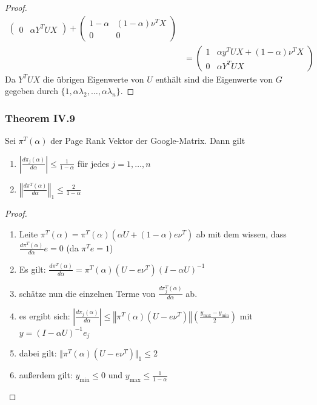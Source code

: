 \documentclass[]{article}
\begin{document}
\begin{proof}
\begin{align*}
\begin{pmatrix}
	0 & \alpha Y^T U X
	\end{pmatrix} 
	+
	\begin{pmatrix}
	1-\alpha & (1- \alpha) \nu^T X \\
	0 & 0
	\end{pmatrix}\\
	&=
	\begin{pmatrix}
	1 & \alpha y^T U X + (1- \alpha)\nu^T X \\
	0 & \alpha Y^T U X
	\end{pmatrix}
	\end{align*}
	Da $Y^T U X$ die übrigen Eigenwerte von $U$ enthält sind die Eigenwerte von $G$ gegeben durch $\{1, \alpha \lambda_2, \dotsc, \alpha \lambda_n \}$.
\end{proof}

\subsubsection*{Theorem IV.9}
Sei $\pi^T(\alpha)$ der Page Rank Vektor der Google-Matrix. Dann gilt
\begin{enumerate}
	\item $\left\vert \frac{d \pi_j(\alpha)}{d \alpha} \right\vert \leq \frac{1}{1- \alpha}$ für jedes $j = 1, \dotsc, n$
	\item $\left\Vert \frac{d \pi^T(\alpha)}{d \alpha} \right\Vert_1 \leq \frac{2}{1-\alpha}$
\end{enumerate}
\begin{proof}
	\begin{enumerate}
		\item Leite $\pi^T(\alpha) = \pi^T(\alpha) \left(\alpha U + (1- \alpha) e \nu^T \right)$ ab mit dem wissen, dass  $\frac{d \pi^T(\alpha)}{d \alpha} e = 0$ (da $\pi^T e = 1$)
		\item Es gilt: $\frac{d \pi^T(\alpha)}{d \alpha} = \pi^T(\alpha) (U - e \nu^T) (I - \alpha U)^{-1}$
		\item schätze nun die einzelnen Terme von $\frac{d \pi_j^T(\alpha)}{d \alpha}$ ab. 
		\item es ergibt sich: $\left\vert \frac{d \pi_j(\alpha)}{d \alpha} \right\vert \leq 
		\left\Vert \pi^T(\alpha) (U - e \nu^T ) \right\Vert \left( \frac{y_{\max} - y_{\min}}{2} \right) $ mit  $ y = (I-\alpha U)^{-1} e_j$
		\item dabei gilt: $\Vert \pi^T(\alpha) (U - e \nu^T ) \Vert_1 \leq 2$
		\item außerdem gilt: $y_{\text{min}}\le 0$ und $y_{\text{max}} \le \frac{1}{1 - \alpha}$
	\end{enumerate}
\end{proof}
\end{document}
